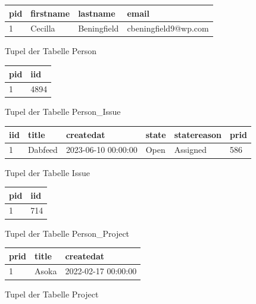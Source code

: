 \begin{figure}[H]
	\centering
	\begin{tabular}{|l | l | l | l |}
	\hline
	pid & firstname & lastname & email \\
	\hline
	1 & Cecilla & Beningfield & cbeningfield9@wp.com \\
	\hline
	\end{tabular}
	\caption{Tupel der Tabelle Person}
\end{figure}
\begin{figure}[H]
	\centering
	\begin{tabular}{|l | l |}
	\hline
	pid & iid \\
	\hline
	1 & 4894 \\
	\hline
	\end{tabular}
	\caption{Tupel der Tabelle Person\_Issue}
\end{figure}
\begin{figure}[H]
	\centering
	\begin{tabular}{|l | l | l | l | l | l|}
	\hline
	iid & title & createdat & state & statereason & prid \\
	\hline
	1 & Dabfeed & 2023-06-10 00:00:00 & Open & Assigned & 586 \\
	\hline
	\end{tabular}
	\caption{Tupel der Tabelle Issue}
\end{figure}
\begin{figure}[H]
	\centering
	\begin{tabular}{|l | l |}
	\hline
	pid & iid \\
	\hline
	1 & 714 \\
	\hline
	\end{tabular}
	\caption{Tupel der Tabelle Person\_Project}
\end{figure}
\begin{figure}[H]
	\centering
	\begin{tabular}{|l | l | l |}
	\hline
	prid & title & createdat \\
	\hline
	1 & Asoka & 2022-02-17 00:00:00 \\
	\hline
	\end{tabular}
	\caption{Tupel der Tabelle Project}
\end{figure}
\newpage


